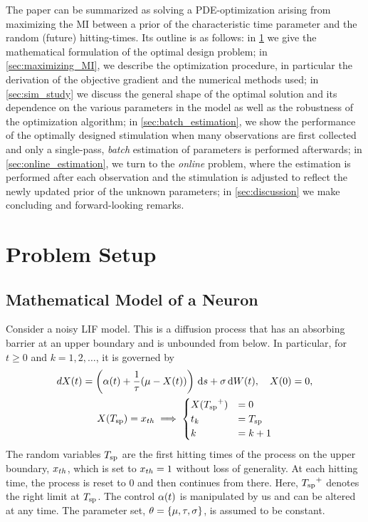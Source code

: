 \documentclass[12pt]{article}
\begin{document}
The paper can be summarized as solving a PDE-optimization arising from
maximizing the MI between a prior of the characteristic time parameter and the
random (future) hitting-times. Its outline is as  follows:  in
\cref{sec:problem_formulation} we give the mathematical formulation of the
optimal design problem; in \cref{sec:maximizing_MI}, we describe the
optimization procedure, in particular the derivation of the objective gradient
and the numerical methods used; in \cref{sec:sim_study} we discuss the general
shape of the optimal solution and its dependence on the various parameters in
the model as well as the robustness of the optimization algorithm; in
\cref{sec:batch_estimation}, we show the performance of the optimally designed
stimulation when many observations are first collected and only a single-pass,
{\sl batch} estimation of parameters is performed afterwards; in
\cref{sec:online_estimation}, we turn to the {\sl online} problem, where the estimation is performed after
each observation and the stimulation is adjusted to reflect the newly updated
prior of the unknown parameters; in \cref{sec:discussion} we make concluding and
forward-looking remarks.
 

\section{Problem Setup}
\label{sec:problem_formulation}
\subsection{Mathematical Model of a Neuron}
Consider a noisy LIF model. This is a diffusion process that has an absorbing
barrier at an upper boundary and is unbounded from below. In particular, for $t
\geq 0$ and $k=1,2,\ldots$, it is governed by
\begin{equation}
\begin{gathered}
dX(t) = \left(\a(t) + \frac 1\tc(\m %
 - {X(t)} ) \right) \intd{s} + \s\intd{W(t)},
\quad X(0) = 0,
\\
X(\ts) = \xth \implies  
\begin{cases}  
X(\ts^+) &= 0   
\\
t_k &=  \ts
\\
k  &= k+1
\end{cases}
\end{gathered} 
\label{eq:X_evolution_uo_control}
\end{equation}
The random variables ${ T_{\textrm{sp} } }$ are the first hitting times of the process on the upper
boundary, ${ x_{th} }$, which is set to ${ x_{th} }=1$ without loss of generality. At each hitting time,
the process is reset to $0$ and then continues from there. Here,
${ T_{\textrm{sp} } }^+$ denotes the right limit at ${ T_{\textrm{sp} } }$. The control 
${\alpha}(t)$ is manipulated by us and can be altered at any
time. The parameter set,
${\theta} = \{{\mu }, { \tau }, {\sigma }\}$, is assumed to be constant. 
\end{document}

